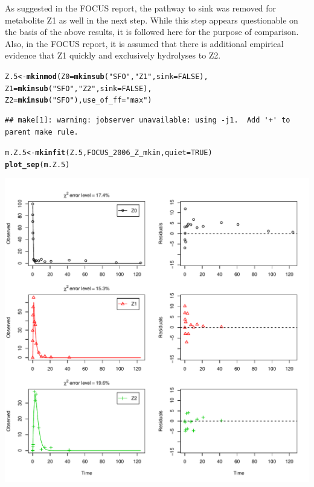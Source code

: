 \documentclass[12pt,a4paper]{article}\usepackage[]{graphicx}\usepackage[]{color}
\makeatletter
\def\maxwidth{ %
  \ifdim\Gin@nat@width>\linewidth
    \linewidth
  \else
    \Gin@nat@width
  \fi
}
\newcommand{\hlnum}[1]{\textcolor[rgb]{0.686,0.059,0.569}{#1}}%
\newcommand{\hlstr}[1]{\textcolor[rgb]{0.192,0.494,0.8}{#1}}%
\newcommand{\hlstd}[1]{\textcolor[rgb]{0.345,0.345,0.345}{#1}}%
\newcommand{\hlkwb}[1]{\textcolor[rgb]{0.69,0.353,0.396}{#1}}%
\newcommand{\hlkwc}[1]{\textcolor[rgb]{0.333,0.667,0.333}{#1}}%
\newcommand{\hlkwd}[1]{\textcolor[rgb]{0.737,0.353,0.396}{\textbf{#1}}}%
\newenvironment{kframe}{%
 \def\at@end@of@kframe{}%
 \ifinner\ifhmode%
  \def\at@end@of@kframe{\end{minipage}}%
  \begin{minipage}{\columnwidth}%
 \fi\fi%
 \def\FrameCommand##1{\hskip\@totalleftmargin \hskip-\fboxsep
 \colorbox{shadecolor}{##1}\hskip-\fboxsep
     \hskip-\linewidth \hskip-\@totalleftmargin \hskip\columnwidth}%
 \MakeFramed {\advance\hsize-\width
   \@totalleftmargin\z@ \linewidth\hsize
   \@setminipage}}%
 {\par\unskip\endMakeFramed%
 \at@end@of@kframe}
\newenvironment{knitrout}{}{} %
\makeatother
\begin{document}
As suggested in the FOCUS report, the pathway to sink was removed for metabolite Z1 as
well in the next step. While this step appears questionable on the basis of the above results, it 
is followed here for the purpose of comparison. Also, in the FOCUS report, it is 
assumed that there is additional empirical evidence that Z1 quickly and exclusively
hydrolyses to Z2. 

\begin{knitrout}
\color{fgcolor}\begin{kframe}
\begin{alltt}
\hlstd{Z.5} \hlkwb{<-} \hlkwd{mkinmod}\hlstd{(}\hlkwc{Z0} \hlstd{=} \hlkwd{mkinsub}\hlstd{(}\hlstr{"SFO"}\hlstd{,} \hlstr{"Z1"}\hlstd{,} \hlkwc{sink} \hlstd{=} \hlnum{FALSE}\hlstd{),}
               \hlkwc{Z1} \hlstd{=} \hlkwd{mkinsub}\hlstd{(}\hlstr{"SFO"}\hlstd{,} \hlstr{"Z2"}\hlstd{,} \hlkwc{sink} \hlstd{=} \hlnum{FALSE}\hlstd{),}
               \hlkwc{Z2} \hlstd{=} \hlkwd{mkinsub}\hlstd{(}\hlstr{"SFO"}\hlstd{),} \hlkwc{use_of_ff} \hlstd{=} \hlstr{"max"}\hlstd{)}
\end{alltt}
\begin{verbatim}
## make[1]: warning: jobserver unavailable: using -j1.  Add '+' to parent make rule.
\end{verbatim}


{\ttfamily\noindent\itshape\color{messagecolor}{\#\# Successfully compiled differential equation model from auto-generated C code.}}\begin{alltt}
\hlstd{m.Z.5} \hlkwb{<-} \hlkwd{mkinfit}\hlstd{(Z.5, FOCUS_2006_Z_mkin,} \hlkwc{quiet} \hlstd{=} \hlnum{TRUE}\hlstd{)}
\hlkwd{plot_sep}\hlstd{(m.Z.5)}
\end{alltt}
\end{kframe}
\includegraphics[width=\maxwidth]{figure/FOCUS_2006_Z_fits_5-1} 

\end{knitrout}
\end{document}
